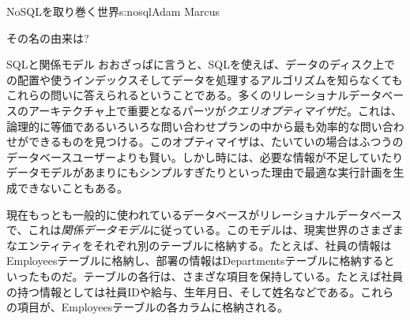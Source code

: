 \begin{aosachapter}{NoSQLを取り巻く世界}{s:nosql}{Adam Marcus}
\begin{aosasect1}{その名の由来は?}
\begin{aosasect2}{SQLと関係モデル}
おおざっぱに言うと、SQLを使えば、データのディスク上での配置や使うインデックスそしてデータを処理するアルゴリズムを知らなくてもこれらの問いに答えられるということである。多くのリレーショナルデータベースのアーキテクチャ上で重要となるパーツが\emph{クエリオプティマイザ}だ。これは、論理的に等価であるいろいろな問い合わせプランの中から最も効率的な問い合わせができるものを見つける。このオプティマイザは、たいていの場合はふつうのデータベースユーザーよりも賢い。しかし時には、必要な情報が不足していたりデータモデルがあまりにもシンプルすぎたりといった理由で最適な実行計画を生成できないこともある。

現在もっとも一般的に使われているデータベースがリレーショナルデータベースで、これは\emph{関係データモデル}に従っている。このモデルは、現実世界のさまざまなエンティティをそれぞれ別のテーブルに格納する。たとえば、社員の情報はEmployeesテーブルに格納し、部署の情報はDepartmentsテーブルに格納するといったものだ。テーブルの各行は、さまざな項目を保持している。たとえば社員の持つ情報としては社員IDや給与、生年月日、そして姓名などである。これらの項目が、Employeesテーブルの各カラムに格納される。


\end{aosasect2}
\end{aosasect1}
\end{aosachapter}
